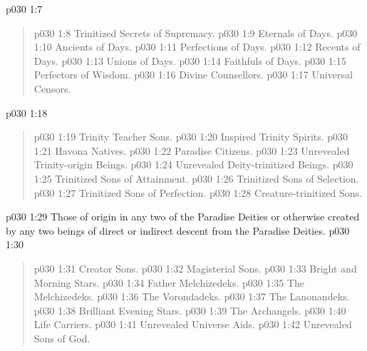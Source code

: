 \vsetspace
\vs p030 1:7 \bibnobreakspace {}
\begin{quote}
\vs p030 1:8 \bibnobreakspace Trinitized Secrets of Supremacy.
\vs p030 1:9 \bibnobreakspace Eternals of Days.
\vs p030 1:10 \bibnobreakspace Ancients of Days.
\vs p030 1:11 \bibnobreakspace Perfections of Days.
\vs p030 1:12 \bibnobreakspace Recents of Days.
\vs p030 1:13 \bibnobreakspace Unions of Days.
\vs p030 1:14 \bibnobreakspace Faithfuls of Days.
\vs p030 1:15 \bibnobreakspace Perfectors of Wisdom.
\vs p030 1:16 \bibnobreakspace Divine Counsellors.
\vs p030 1:17 \bibnobreakspace Universal Censors.
\end{quote}
\vsetspace
\vs p030 1:18 \bibnobreakspace {}
\begin{quote}
\vs p030 1:19 \bibnobreakspace Trinity Teacher Sons.
\vs p030 1:20 \bibnobreakspace Inspired Trinity Spirits.
\vs p030 1:21 \bibnobreakspace Havona Natives.
\vs p030 1:22 \bibnobreakspace Paradise Citizens.
\vs p030 1:23 \bibnobreakspace Unrevealed Trinity\hyp{}origin Beings.
\vs p030 1:24 \bibnobreakspace Unrevealed Deity\hyp{}trinitized Beings.
\vs p030 1:25 \bibnobreakspace Trinitized Sons of Attainment.
\vs p030 1:26 \bibnobreakspace Trinitized Sons of Selection.
\vs p030 1:27 \bibnobreakspace Trinitized Sons of Perfection.
\vs p030 1:28 \bibnobreakspace Creature\hyp{}trinitized Sons.
\end{quote}
\vsetspace
\vs p030 1:29 \bibnobreakspace {} Those of origin in any two of the Paradise Deities or otherwise created by any two beings of direct or indirect descent from the Paradise Deities.
\vsetspace
\vs p030 1:30 \bibnobreakspace {}
\begin{quote}
\vs p030 1:31 \bibnobreakspace Creator Sons.
\vs p030 1:32 \bibnobreakspace Magisterial Sons.
\vs p030 1:33 \bibnobreakspace Bright and Morning Stars.
\vs p030 1:34 \bibnobreakspace Father Melchizedeks.
\vs p030 1:35 \bibnobreakspace The Melchizedeks.
\vs p030 1:36 \bibnobreakspace The Vorondadeks.
\vs p030 1:37 \bibnobreakspace The Lanonandeks.
\vs p030 1:38 \bibnobreakspace Brilliant Evening Stars.
\vs p030 1:39 \bibnobreakspace The Archangels.
\vs p030 1:40 \bibnobreakspace Life Carriers.
\vs p030 1:41 \bibnobreakspace Unrevealed Universe Aids.
\vs p030 1:42 \bibnobreakspace Unrevealed Sons of God.
\end{quote}
